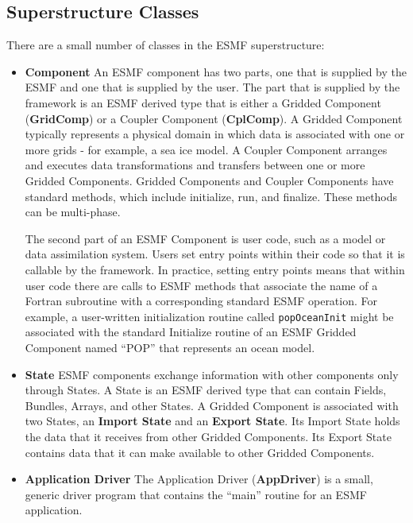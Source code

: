 \subsection{Superstructure Classes}

There are a small number of classes in the ESMF superstructure:

\begin{itemize}
\item {\bf Component}  An ESMF component has two parts, one that is 
supplied by the ESMF and one that is supplied by the user.  The
part that is supplied by the framework is an ESMF derived type that
is either a Gridded Component ({\bf GridComp}) or a Coupler 
Component ({\bf CplComp}).  A Gridded Component typically represents
a physical domain in which data is associated with one or more 
grids - for example, a sea ice model.  A Coupler Component 
arranges and executes data transformations and transfers between
one or more Gridded Components. Gridded Components and Coupler 
Components have standard methods, which include initialize, run,
and finalize.  These methods can be multi-phase.

The second part of an ESMF Component is user code, such as a
model or data assimilation system.  Users set entry points 
within their code so that it is callable by the framework.  
In practice, setting entry points means that within user code 
there are calls to ESMF methods that associate the name of a 
Fortran subroutine with a corresponding standard ESMF operation.  
For example, a user-written initialization routine called 
{\tt popOceanInit} might be associated with the standard 
Initialize routine of an ESMF Gridded Component named ``POP'' 
that represents an ocean model.

\item {\bf State}  ESMF components exchange information with other 
components only through States.  A State is an ESMF derived
type that can contain Fields, Bundles, Arrays, and other
States.  A Gridded Component  is associated with two States, an 
{\bf Import State} and an {\bf Export State}.  Its Import State 
holds the data that it receives from other Gridded Components.  
Its Export State contains data that it can make available to 
other Gridded Components. 

\item {\bf Application Driver} The Application Driver ({\bf AppDriver}) 
is a small, generic driver program that contains the ``main'' 
routine for an ESMF application.

\end{itemize}

